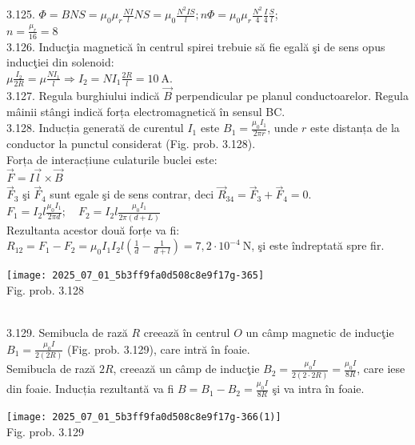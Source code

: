 3.125. $\Phi=B N S=\mu_{0} \mu_{r} \frac{N I}{l} N S=\mu_{0} \frac{N^{2} I S}{l} ; n \Phi=\mu_{0} \mu_{r} \frac{N^{2}}{4} \frac{I}{4} \frac{S}{l}$;\\ $n=\frac{\mu_{r}}{16}=8$\\

3.126. Inducţia magnetică în centrul spirei trebuie să fie egală şi de sens opus inducţiei din solenoid:\\ $\mu \frac{I_{2}}{2 R}=\mu \frac{N I_{1}}{l} \Rightarrow I_{2}=N I_{1} \frac{2 R}{l}=10 \mathrm{~A}$.\\

3.127. Regula burghiului indică $\vec{B}$ perpendicular pe planul conductoarelor. Regula mâinii stângi indică forța electromagnetică în sensul BC.\\

3.128. Inducția generată de curentul $I_{1}$ este $B_{1}=\frac{\mu_{0} I_{1}}{2 \pi r}$, unde $r$ este distanța de la conductor la punctul considerat (Fig. prob. 3.128).\\ Forța de interacțiune culaturile buclei este:\\ $\vec{F}=I \vec{l} \times \vec{B}$\\ $\vec{F}_{3}$ şi $\vec{F}_{4}$ sunt egale şi de sens contrar, deci $\vec{R}_{34}=\vec{F}_{3}+\vec{F}_{4}=0$.\\ $F_{1}=I_{2} l \frac{\mu_{0} I_{1}}{2 \pi d} ; \quad F_{2}=I_{2} l \frac{\mu_{0} I_{1}}{2 \pi(d+L)}$\\ Rezultanta acestor două forțe va fi:\\ $R_{12}=F_{1}-F_{2}=\mu_{0} I_{1} I_{2} l\left(\frac{1}{d}-\frac{1}{d+l}\right)=7,2 \cdot 10^{-4} \mathrm{~N}$, şi este îndreptată spre fir.\\ \begin{center} \texttt{[image: 2025\_07\_01\_5b3ff9fa0d508c8e9f17g-365]}\\ Fig. prob. 3.128 \end{center}\\

3.129. Semibucla de rază $R$ creează în centrul $O$ un câmp magnetic de inducţie $B_{1}=\frac{\mu_{0} I}{2(2 R)}$ (Fig. prob. 3.129), care intră în foaie.\\ Semibucla de rază $2 R$, creează un câmp de inducţie $B_{2}=\frac{\mu_{0} I}{2(2 \cdot 2 R)}=\frac{\mu_{0} I}{8 R}$, care iese din foaie. Inducția rezultantă va fi $B=B_{1}-B_{2}=\frac{\mu_{0} I}{8 R}$ şi va intra în foaie.\\ \begin{center} \texttt{[image: 2025\_07\_01\_5b3ff9fa0d508c8e9f17g-366(1)]}\\ Fig. prob. 3.129 \end{center}\\

